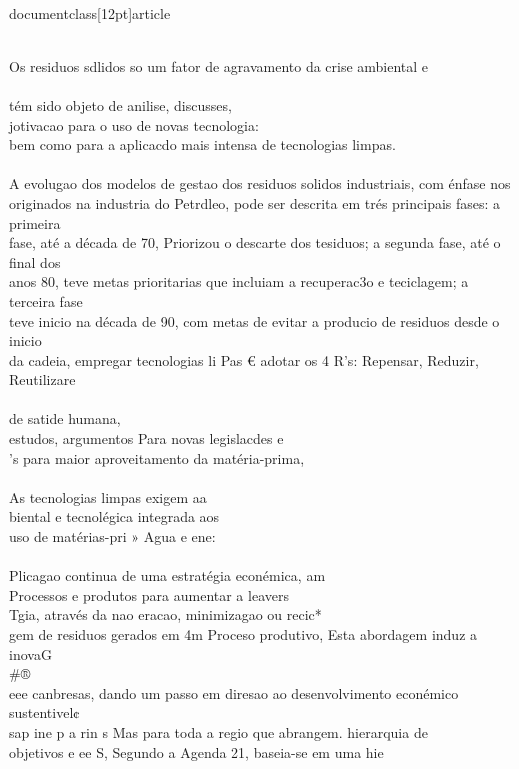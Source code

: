 \\documentclass[12pt]{article}
\begin{document}
\\
Os residuos sdlidos so um fator de agravamento da crise ambiental e\\
\\
tém sido objeto de anilise, discusses,\\
jotivacao para o uso de novas tecnologia:\\
bem como para a aplicacdo mais intensa de tecnologias limpas.\\
\\
A evolugao dos modelos de gestao dos residuos solidos industriais, com énfase nos\\
originados na industria do Petrdleo, pode ser descrita em trés principais fases: a primeira\\
fase, até a década de 70, Priorizou o descarte dos tesiduos; a segunda fase, até o final dos\\
anos 80, teve metas prioritarias que incluiam a recuperac3o e teciclagem; a terceira fase\\
teve inicio na década de 90, com metas de evitar a producio de residuos desde o inicio\\
da cadeia, empregar tecnologias li Pas € adotar os 4 R’s: Repensar, Reduzir, Reutilizare\\
\\
de satide humana,\\
estudos, argumentos Para novas legislacdes e\\
's para maior aproveitamento da matéria-prima,\\
\\
As tecnologias limpas exigem aa\\
biental e tecnolégica integrada aos\\
uso de matérias-pri » Agua e ene:\\
\\
Plicagao continua de uma estratégia econémica, am\\
Processos e produtos para aumentar a leavers\\
Tgia, através da nao eracao, minimizagao ou recic*\\
gem de residuos gerados em 4m Proceso produtivo, Esta abordagem induz a inovaG\\#®\\
eee canbresas, dando um passo em diresao ao desenvolvimento econémico sustentivel¢\\
sap ine p a rin s Mas para toda a regio que abrangem. hierarquia de\\
objetivos e ee S, Segundo a Agenda 21, baseia-se em uma hie\\
\end{document}
